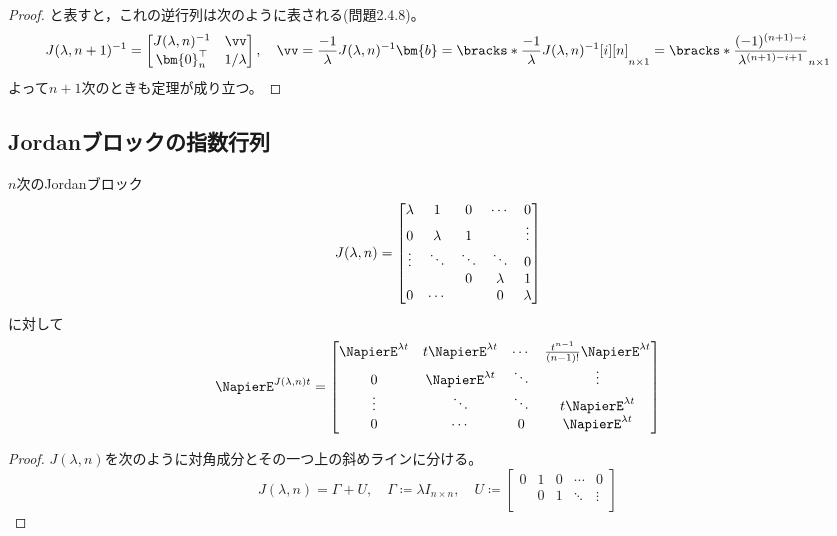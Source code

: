 {\begin{proof}
                    と表すと，これの逆行列は次のように表される(\cite{入門線形代数}問題2.4.8)。
                    \[
                        J(\lambda,n+1)^{-1} =
                        \begin{bmatrix}
                            J(\lambda,n)^{-1} & \vv \\
                            \bm{0}_n^\top & 1/\lambda
                        \end{bmatrix}
                        ,\quad
                        \vv = \frac{-1}{\lambda}J(\lambda,n)^{-1}\bm{b} = \bracks*{\frac{-1}{\lambda}J(\lambda,n)^{-1}[i][n]}_{n\times 1} = \bracks*{\frac{(-1)^{(n+1)-i}}{\lambda^{(n+1)-i+1}}}_{n\times 1}
                    \]
                    よって$n+1$次のときも定理が成り立つ。
                \end{proof}
        \subsection{Jordanブロックの指数行列}
            \begin{shadebox}
                $n$次のJordanブロック
                \[J(\lambda, n) = \begin{bmatrix} \lambda & 1 & 0 & \cdots & 0\\0 & \lambda & 1 & & \vdots\\\vdots & \ddots & \ddots & \ddots & 0\\& & 0 & \lambda & 1\\0 & \cdots & & 0 & \lambda \end{bmatrix}\]
                に対して
                \[
                    \NapierE^{J(\lambda, n)t} =
                    \begin{bmatrix}
                        \NapierE^{\lambda t}    & t\NapierE^{\lambda t}    & \cdots    & \frac{t^{n-1}}{(n-1)!}\NapierE^{\lambda t}\\
                        0                & \NapierE^{\lambda t}        & \ddots    & \vdots\\
                        \vdots            & \ddots            & \ddots    & t\NapierE^{\lambda t}\\
                        0                & \cdots            & 0            & \NapierE^{\lambda t}
                    \end{bmatrix}
                \]
            \end{shadebox}
            \begin{proof}
                $J(\lambda, n)$を次のように対角成分とその一つ上の斜めラインに分ける。
                \[
                    J(\lambda, n)=\Gamma+U,\quad
                    \Gamma\coloneq\lambda I_{n\times n},\quad
                    U\coloneq
                    \begin{bmatrix}
                        0        & 1    & 0            & \cdots    & 0\\
                                & 0    & 1            & \ddots    & \vdots\\

\end{bmatrix}\]
\end{proof}}
